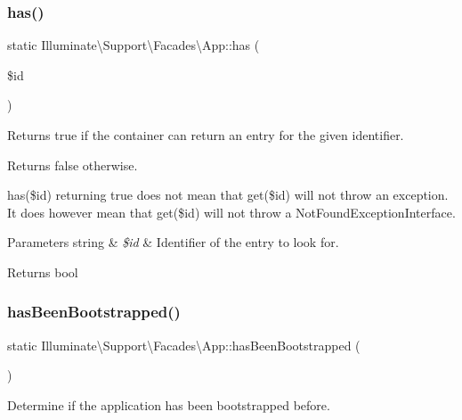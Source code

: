 \subsubsection{\texorpdfstring{has()}{has()}}
{\footnotesize\ttfamily static Illuminate\textbackslash{}\+Support\textbackslash{}\+Facades\textbackslash{}\+App\+::has (\begin{DoxyParamCaption}\item[{}]{\$id }\end{DoxyParamCaption})\hspace{0.3cm}{\ttfamily [static]}}

Returns true if the container can return an entry for the given identifier.

Returns false otherwise.

{\ttfamily has(\$id)} returning true does not mean that {\ttfamily get(\$id)} will not throw an exception. It does however mean that {\ttfamily get(\$id)} will not throw a {\ttfamily Not\+Found\+Exception\+Interface}.


\begin{DoxyParams}[1]{Parameters}
string & {\em \$id} & Identifier of the entry to look for. \\
\hline
\end{DoxyParams}
\begin{DoxyReturn}{Returns}
bool 
\end{DoxyReturn}
\mbox{\label{class_illuminate_1_1_support_1_1_facades_1_1_app_aa21c13916407cbc1db73a02d7c925ddf}} 
\subsubsection{\texorpdfstring{has\+Been\+Bootstrapped()}{hasBeenBootstrapped()}}
{\footnotesize\ttfamily static Illuminate\textbackslash{}\+Support\textbackslash{}\+Facades\textbackslash{}\+App\+::has\+Been\+Bootstrapped (\begin{DoxyParamCaption}{ }\end{DoxyParamCaption})\hspace{0.3cm}{\ttfamily [static]}}

Determine if the application has been bootstrapped before.

